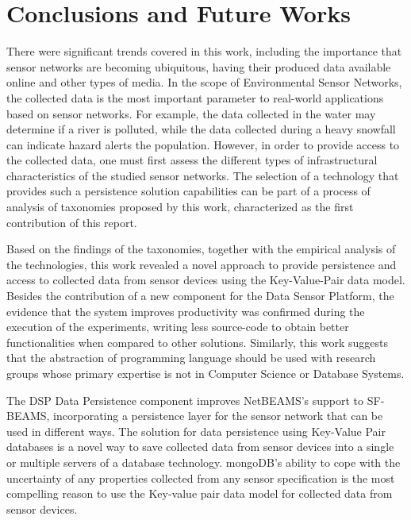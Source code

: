 

\chapter{Conclusions and Future Works}

There were significant trends covered in this work, including the importance
that sensor networks are becoming ubiquitous, having their produced data
available online and other types of media. In the scope of Environmental Sensor
Networks, the collected data is the most important parameter to real-world
applications based on sensor networks. For example, the data collected in the
water may determine if a river is polluted, while the data collected during a
heavy snowfall can indicate hazard alerts the population. However, in order to
provide access to the collected data, one must first assess the different types of
infrastructural characteristics of the studied sensor networks. The selection
of a technology that provides such a persistence solution capabilities can be
part of a process of analysis of taxonomies proposed by this work,
characterized as the first contribution of this report.

Based on the findings of the taxonomies, together with the empirical analysis
of the technologies, this work revealed a novel approach to provide
persistence and access to collected data from sensor devices using the
Key-Value-Pair data model. Besides the contribution of a new component for the
Data Sensor Platform, the evidence that the system improves productivity was
confirmed during the execution of the experiments, writing less source-code to
obtain better functionalities when compared to other solutions. Similarly,
this work suggests that the abstraction of programming language should be
used with research groups whose primary expertise is not in Computer Science
or Database Systems.

The DSP Data Persistence component improves NetBEAMS's support to SF-BEAMS,
incorporating a persistence layer for the sensor network that can be used in
different ways. The solution for data persistence using Key-Value Pair
databases is a novel way to save collected data from sensor devices into a
single or multiple servers of a database technology. mongoDB's ability to cope
with the uncertainty of any properties collected from any sensor specification
is the most compelling reason to use the Key-value pair data model for collected
data from sensor devices.

